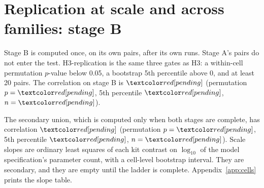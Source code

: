\section{Replication at scale and across families: stage B}
\label{sec:replication}

Stage B is computed once, on its own pairs, after its own runs.
Stage A's pairs do not enter the test.
H3-replication is the same three gates as H3: a within-cell permutation $p$-value below 0.05, a bootstrap 5th percentile above 0, and at least 20 pairs.
The correlation on stage B is $\HThreeRepRho{}$ (permutation $p = \HThreeRepP{}$, 5th percentile $\HThreeRepQFive{}$, $n = \HThreeRepN{}$).

The secondary union, which is computed only when both stages are complete, has correlation $\HThreeAllRho{}$ (permutation $p = \HThreeAllP{}$, 5th percentile $\HThreeAllQFive{}$, $n = \HThreeAllN{}$).
Scale slopes are ordinary least squares of each kit contrast on $\log_{10}$ of the model specification's parameter count, with a cell-level bootstrap interval.
They are secondary, and they are empty until the ladder is complete.
Appendix~\ref{app:cells} prints the slope table.
